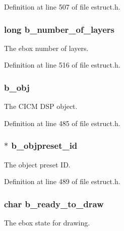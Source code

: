 Definition at line 507 of file estruct.\-h.

\hypertarget{struct__edspbox_a84105957ca11a224cf734f350fb23ac9}{
\subsubsection[{b\-\_\-number\-\_\-of\-\_\-layers}]{\setlength{\rightskip}{0pt plus 5cm}long b\-\_\-number\-\_\-of\-\_\-layers}}\label{struct__edspbox_a84105957ca11a224cf734f350fb23ac9}
The ebox number of layers. 

Definition at line 516 of file estruct.\-h.

\hypertarget{struct__edspbox_a384a670299e98768527fbe457de9a38a}{
\subsubsection[{b\-\_\-obj}]{ b\-\_\-obj}}\label{struct__edspbox_a384a670299e98768527fbe457de9a38a}
The C\-I\-C\-M D\-S\-P object. 

Definition at line 485 of file estruct.\-h.

\hypertarget{struct__edspbox_adc377263d208d1051f4a0997868b1155}{
\subsubsection[{b\-\_\-objpreset\-\_\-id}]{$\ast$ b\-\_\-objpreset\-\_\-id}}\label{struct__edspbox_adc377263d208d1051f4a0997868b1155}
The object preset I\-D. 

Definition at line 489 of file estruct.\-h.

\hypertarget{struct__edspbox_a234ea03e103bd45f5fa1d27b8e69b5dd}{
\subsubsection[{b\-\_\-ready\-\_\-to\-\_\-draw}]{\setlength{\rightskip}{0pt plus 5cm}char b\-\_\-ready\-\_\-to\-\_\-draw}}\label{struct__edspbox_a234ea03e103bd45f5fa1d27b8e69b5dd}
The ebox state for drawing. 

